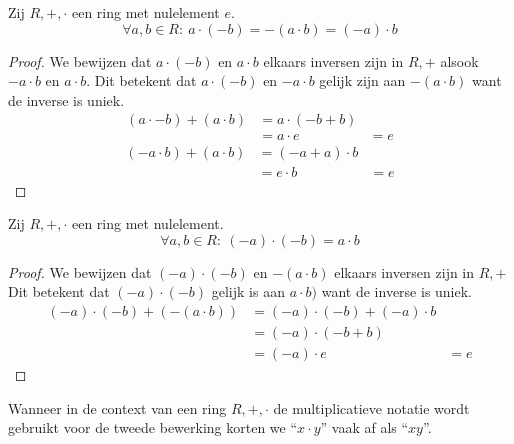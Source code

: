 \documentclass[main.tex]{subfiles}
\begin{document}
\begin{ei}
  \label{ei:min-door-maal}
  Zij $R,+,\cdot$ een ring met nulelement $e$. 
  \[ \forall a,b \in R:\ a \cdot (-b) = -(a \cdot b) = (-a) \cdot b \]
 
  \begin{proof}
    We bewijzen dat $a \cdot (-b)$ en $a \cdot b$ elkaars inversen zijn in $R,+$ alsook $-a \cdot b$ en $a \cdot b$.
    Dit betekent dat $a \cdot (-b)$ en $-a \cdot b$ gelijk zijn aan $-(a \cdot b)$ want de inverse is uniek.
    \[
    \begin{array}{rll}
      (a \cdot -b) + (a \cdot b) &= a \cdot (-b + b) &\\
                                 &= a \cdot e &= e 
    \end{array}
    \]  
    \[
    \begin{array}{rll}
      (-a \cdot b) + (a \cdot b) &= (-a + a) \cdot b &\\
                                 &= e \cdot b &= e 
    \end{array}
    \]      
  \end{proof}
\end{ei}

\begin{ei}
  Zij $R,+,\cdot$ een ring met nulelement.
  \[ \forall a,b \in R:\ (-a) \cdot (-b) = a \cdot b \]

  \begin{proof}
    We bewijzen dat $(-a) \cdot (-b)$ en $-(a \cdot b)$ elkaars inversen zijn in $R,+$
    Dit betekent dat $(-a) \cdot (-b)$ gelijk is aan $a \cdot b)$ want de inverse is uniek.
    \[
    \begin{array}{rll}
      (-a) \cdot (-b) + (- (a \cdot b)) &= (-a) \cdot (-b) + (-a) \cdot b &\\
                                        &= (-a) \cdot (-b + b) &\\
                                        &= (-a) \cdot e &= e
    \end{array}
    \]
  \end{proof}
\end{ei}

\begin{de}
  Wanneer in de context van een ring $R,+,\cdot$ de multiplicatieve notatie wordt gebruikt voor de tweede bewerking korten we ``$x \cdot y$'' vaak af als ``$xy$''.
\end{de}
\end{document}
